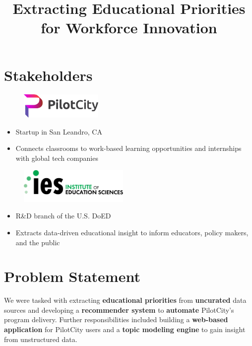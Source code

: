 \documentclass[clinic]{hmcposter}
\title{Extracting Educational Priorities\protect\\ for Workforce Innovation}
\begin{document}
\begin{poster}

\section{Stakeholders}

\begin{multicols}{2}
\centering
\begin{figure}
\includegraphics[width=150]{pilotcity.png}
\end{figure}
\begin{itemize}
\item Startup in San Leandro, CA
\item Connects classrooms to work-based learning opportunities and internships with global tech companies
\end{itemize}
\vfill
\columnbreak
\centering
\begin{figure}
\includegraphics[width=200]{ies.png}
\end{figure}
\begin{itemize}
\item R\&D branch of the U.S. DoED
\item Extracts data-driven educational insight to inform educators, policy makers, and the public
\end{itemize}
\end{multicols}

\section{Problem Statement}
We were tasked with extracting \textbf{ \textcolor{hmcorange}{{\large educational priorities}}} from \textbf{\textcolor{hmcorange}{{\large uncurated}}} data sources and developing a \textbf{\textcolor{hmcorange}{{\large recommender system}}} to \textbf{\textcolor{hmcorange}{{\large automate}}} PilotCity's program delivery. Further responsibilities included building a \textbf{\textcolor{hmcorange}{{\large web-based application}}} for PilotCity users and a \textbf{\textcolor{hmcorange}{{\large topic modeling engine}}} to gain insight from unstructured data.


\end{poster}
\end{document}
